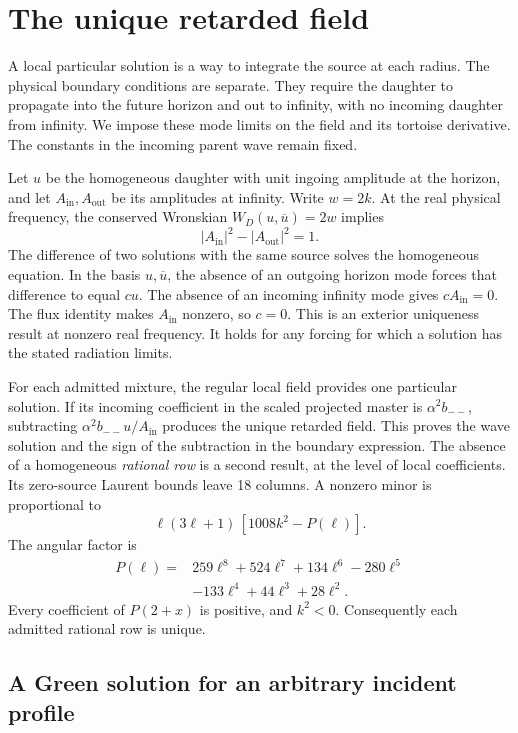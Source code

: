 \section{The unique retarded field}
\label{sec:unique-retarded}

A local particular solution is a way to integrate the source at each radius.
The physical boundary conditions are separate. They require the daughter to
propagate into the future horizon and out to infinity, with no incoming
daughter from infinity. We impose these mode limits on the field and its
tortoise derivative. The constants in the incoming parent wave remain fixed.

Let \(u\) be the homogeneous daughter with unit ingoing amplitude at the
horizon, and let \(A_{\mathrm{in}},A_{\mathrm{out}}\) be its amplitudes at
infinity. Write \(w=2k\). At the real physical frequency, the conserved
Wronskian \(W_D(u,\overline u)=2w\) implies
\[
 |A_{\mathrm{in}}|^2-|A_{\mathrm{out}}|^2=1 .
\]
The difference of two solutions with the same source solves the homogeneous
equation. In the basis \(u,\overline u\), the absence of an outgoing horizon
mode forces that difference to equal \(c u\). The absence of an incoming
infinity mode gives \(c A_{\mathrm{in}}=0\). The flux identity makes
\(A_{\mathrm{in}}\) nonzero, so \(c=0\).
This is an exterior uniqueness result at nonzero real frequency. It holds
for any forcing for which a solution has the stated radiation limits.

For each admitted mixture, the regular local field provides one particular
solution. If its incoming coefficient in the scaled projected master is
\(\alpha^2 b_{--}\), subtracting \(\alpha^2 b_{--}u/A_{\mathrm{in}}\)
produces the unique retarded field. This proves the wave solution and the
sign of the subtraction in the boundary expression. The absence of a
homogeneous \emph{rational row} is a second result, at the level of local
coefficients. Its zero-source Laurent bounds leave 18 columns. A nonzero
minor is proportional to
\[
 \ell(3\ell+1)\,[1008 k^2-P(\ell)].
\]
The angular factor is
\[
 \begin{aligned}
 P(\ell)={}&259\ell^8+524\ell^7+134\ell^6-280\ell^5\\
           &-133\ell^4+44\ell^3+28\ell^2 .
 \end{aligned}
\]
Every coefficient of \(P(2+x)\) is positive, and \(k^2<0\).
Consequently each admitted rational row is unique.

\subsection{A Green solution for an arbitrary incident profile}

